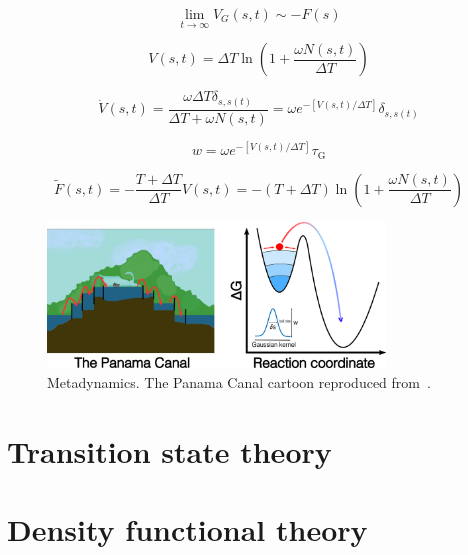 \begin{equation}
\label{eq:free_energy_from_metadynamics}
\lim_{t \to \infty} V_G(s,t) \sim -F(s)
\end{equation}

\begin{equation}
V(s, t) = \Delta T \ln\left(1 + \frac{\omega N(s, t)}{\Delta T}\right)
\label{eq:history_dependant_potential}
\end{equation}

\begin{equation}
\label{eq:hill_deposition_rate}
\dot{V}(s,t) = \frac{\omega \Delta T \delta_{s,s(t)}}{\Delta T + \omega N(s,t)} 
= \omega e^{-[V(s,t)/\Delta T]} \delta_{s,s(t)}
\end{equation}

\begin{equation}
w = \omega e^{-[V(s,t)/\Delta T]} \tau_{\text{G}}
\label{eq:hill_height}
\end{equation}

\begin{equation}
\label{eq:free_energy_surface_reconstruction}
\tilde{F}(s,t) = -\frac{T + \Delta T}{\Delta T} V(s,t) 
= -(T + \Delta T) \ln\left(1 + \frac{\omega N(s,t)}{\Delta T} \right)
\end{equation}

\begin{figure}[htbp]
    \centering
    \includegraphics[width=0.8\textwidth]{Figures/2_Theory/theory_metadynamics.png}
    \caption{Metadynamics. The Panama Canal cartoon reproduced from~\citep{HowPanamaCanal}.}
    \label{fig:metadynamics}
\end{figure}



\section{Transition state theory}



\section{Density functional theory}

